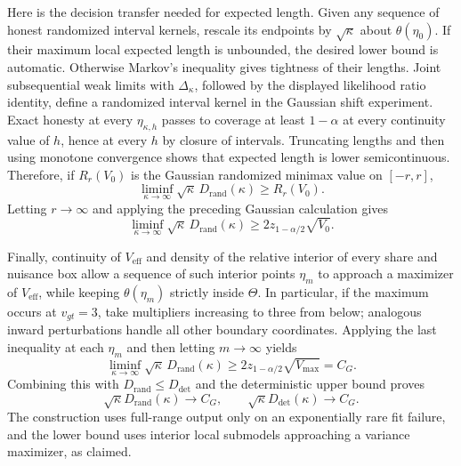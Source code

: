 Here is the decision transfer needed for expected length.  Given any
sequence of honest randomized interval kernels, rescale its endpoints by
\(\sqrt\kappa\) about \(\theta(\eta_0)\).  If their maximum local expected
length is unbounded, the desired lower bound is automatic.  Otherwise
Markov's inequality gives tightness of their lengths.  Joint subsequential
weak limits with \(\Delta_\kappa\), followed by the displayed likelihood
ratio identity, define a randomized interval kernel in the Gaussian shift
experiment.  Exact honesty at every \(\eta_{\kappa,h}\) passes to coverage
at least \(1-\alpha\) at every continuity value of \(h\), hence at every
\(h\) by closure of intervals.  Truncating lengths and then using monotone
convergence shows that expected length is lower semicontinuous.  Therefore,
if \(R_r(V_0)\) is the Gaussian randomized minimax value on
\([-r,r]\),
\[
 \liminf_{\kappa\to\infty}
 \sqrt\kappa\,D_{\mathrm{rand}}(\kappa)\geq R_r(V_0).
\]
Letting \(r\to\infty\) and applying the preceding Gaussian calculation
gives
\[
 \liminf_{\kappa\to\infty}
 \sqrt\kappa\,D_{\mathrm{rand}}(\kappa)
 \geq2z_{1-\alpha/2}\sqrt{V_0}.
\]

Finally, continuity of \(V_{\mathrm{eff}}\) and density of the relative
interior of every share and nuisance box allow a sequence of such interior
points \(\eta_m\) to approach a maximizer of \(V_{\mathrm{eff}}\), while
keeping \(\theta(\eta_m)\) strictly inside \(\Theta\).  In particular,
if the maximum occurs at \(v_{gt}=3\), take multipliers increasing to
three from below; analogous inward perturbations handle all other boundary
coordinates.  Applying the last inequality at each \(\eta_m\) and then
letting \(m\to\infty\) yields
\[
 \liminf_{\kappa\to\infty}
 \sqrt\kappa\,D_{\mathrm{rand}}(\kappa)
 \geq2z_{1-\alpha/2}\sqrt{V_{\max}}=C_G.
\]
Combining this with
\(D_{\mathrm{rand}}\leq D_{\mathrm{det}}\) and the deterministic upper
bound proves
\[
 \sqrt\kappa D_{\mathrm{rand}}(\kappa)\longrightarrow C_G,
 \qquad
 \sqrt\kappa D_{\mathrm{det}}(\kappa)\longrightarrow C_G.
\]
The construction uses full-range output only on an exponentially rare fit
failure, and the lower bound uses interior local submodels approaching a
variance maximizer, as claimed.
